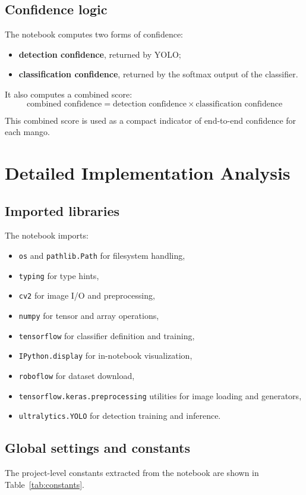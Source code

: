 \documentclass[12pt,a4paper]{article}
\begin{document}
\subsection{Confidence logic}
The notebook computes two forms of confidence:
\begin{itemize}
    \item \textbf{detection confidence}, returned by YOLO;
    \item \textbf{classification confidence}, returned by the softmax output of the classifier.
\end{itemize}

It also computes a combined score:
\[
\text{combined confidence} = \text{detection confidence} \times \text{classification confidence}
\]

This combined score is used as a compact indicator of end-to-end confidence for each mango.

\section{Detailed Implementation Analysis}
\subsection{Imported libraries}
The notebook imports:
\begin{itemize}
    \item \texttt{os} and \texttt{pathlib.Path} for filesystem handling,
    \item \texttt{typing} for type hints,
    \item \texttt{cv2} for image I/O and preprocessing,
    \item \texttt{numpy} for tensor and array operations,
    \item \texttt{tensorflow} for classifier definition and training,
    \item \texttt{IPython.display} for in-notebook visualization,
    \item \texttt{roboflow} for dataset download,
    \item \texttt{tensorflow.keras.preprocessing} utilities for image loading and generators,
    \item \texttt{ultralytics.YOLO} for detection training and inference.
\end{itemize}

\subsection{Global settings and constants}
The project-level constants extracted from the notebook are shown in Table~\ref{tab:constants}.
\end{document}
